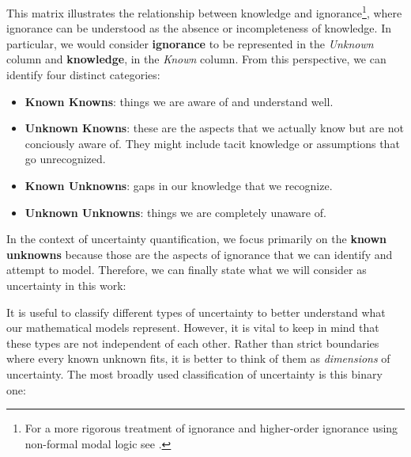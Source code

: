 This matrix illustrates the relationship between knowledge and ignorance\footnote{For a more rigorous treatment of ignorance and higher-order ignorance using non-formal modal logic see \cite{firstorderignorance}.}, where ignorance can be understood as the absence or incompleteness of knowledge. In particular, we would consider \textbf{ignorance} to be represented in the \textit{Unknown} column and \textbf{knowledge}, in the \textit{Known} column. From this perspective, we can identify four distinct categories:
\begin{itemize}
    \item \textbf{Known Knowns}: things we are aware of and understand well.
    \item \textbf{Unknown Knowns}: these are the aspects that we actually know but are not conciously aware of. They might include tacit knowledge or assumptions that go unrecognized.
    \item \textbf{Known Unknowns}: gaps in our knowledge that we recognize.
    \item \textbf{Unknown Unknowns}: things we are completely unaware of.
\end{itemize}

In the context of uncertainty quantification, we focus primarily on the \textbf{known unknowns} because those are the aspects of ignorance that we can identify and attempt to model. Therefore, we can finally state what we will consider as uncertainty in this work:\\


\begin{definition}
    \cite{UncertaintySciences}
\end{definition}

It is useful to classify different types of uncertainty to better understand what our mathematical models represent. However, it is vital to keep in mind that these types are not independent of each other. Rather than strict boundaries where every known unknown fits, it is better to think of them as \textit{dimensions} of uncertainty. The most broadly used classification of uncertainty is this binary one:\\

